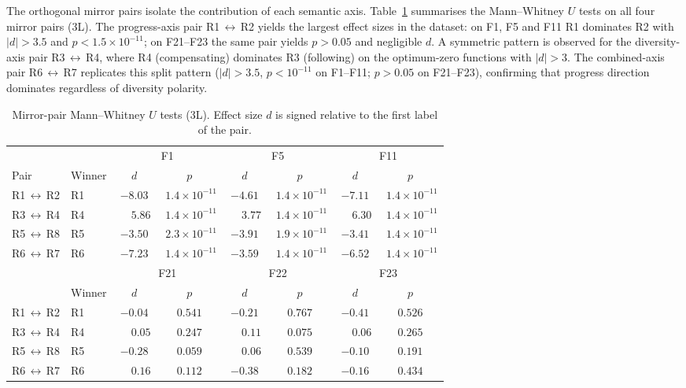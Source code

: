 \documentclass[runningheads]{llncs}
\begin{document}
The orthogonal mirror pairs isolate the contribution of each semantic axis. Table~\ref{tab:mirror} summarises the Mann--Whitney $U$ tests on all four mirror pairs (3L). The progress-axis pair R1\,$\leftrightarrow$\,R2 yields the largest effect sizes in the dataset: on F1, F5 and F11 R1 dominates R2 with $|d|>3.5$ and $p<1.5\times 10^{-11}$; on F21--F23 the same pair yields $p>0.05$ and negligible $d$. A symmetric pattern is observed for the diversity-axis pair R3\,$\leftrightarrow$\,R4, where R4 (compensating) dominates R3 (following) on the optimum-zero functions with $|d|>3$. The combined-axis pair R6\,$\leftrightarrow$\,R7 replicates this split pattern ($|d|>3.5$, $p<10^{-11}$ on F1--F11; $p>0.05$ on F21--F23), confirming that progress direction dominates regardless of diversity polarity.





\begin{table}[H]
\scriptsize
\caption{Mirror-pair Mann--Whitney $U$ tests (3L). Effect size $d$ is signed relative to the first label of the pair.}\label{tab:mirror}
\centering
\setlength{\tabcolsep}{3pt}
\begin{tabular}{ll cc cc cc}
\toprule
& & \multicolumn{2}{c}{F1} & \multicolumn{2}{c}{F5} & \multicolumn{2}{c}{F11} \\
Pair & Winner & $d$ & $p$ & $d$ & $p$ & $d$ & $p$ \\
\midrule
R1\,$\leftrightarrow$\,R2 & R1 & $-8.03$ & $\,\,1.4\!\times\!10^{-11}$ & $-4.61$ & $\,\,1.4\!\times\!10^{-11}$ & $-7.11$ & $\,\,1.4\!\times\!10^{-11}$ \\
R3\,$\leftrightarrow$\,R4 & R4 & $\phantom{-}5.86$ & $\,\,1.4\!\times\!10^{-11}$ & $\phantom{-}3.77$ & $\,\,1.4\!\times\!10^{-11}$ & $\phantom{-}6.30$ & $\,\,1.4\!\times\!10^{-11}$ \\
R5\,$\leftrightarrow$\,R8 & R5 & $-3.50$ & $\,\,2.3\!\times\!10^{-11}$ & $-3.91$ & $\,\,1.9\!\times\!10^{-11}$ & $-3.41$ & $\,\,1.4\!\times\!10^{-11}$ \\
R6\,$\leftrightarrow$\,R7 & R6 & $-7.23$ & $\,\,1.4\!\times\!10^{-11}$ & $-3.59$ & $\,\,1.4\!\times\!10^{-11}$ & $-6.52$ & $\,\,1.4\!\times\!10^{-11}$ \\
\midrule
& & \multicolumn{2}{c}{F21} & \multicolumn{2}{c}{F22} & \multicolumn{2}{c}{F23} \\
& Winner & $d$ & $p$ & $d$ & $p$ & $d$ & $p$ \\
\midrule
R1\,$\leftrightarrow$\,R2 & R1 & $-0.04$ & $0.541$ & $-0.21$ & $0.767$ & $-0.41$ & $0.526$ \\
R3\,$\leftrightarrow$\,R4 & R4 & $\phantom{-}0.05$ & $0.247$ & $\phantom{-}0.11$ & $0.075$ & $\phantom{-}0.06$ & $0.265$ \\
R5\,$\leftrightarrow$\,R8 & R5 & $-0.28$ & $0.059$ & $\phantom{-}0.06$ & $0.539$ & $-0.10$ & $0.191$ \\
R6\,$\leftrightarrow$\,R7 & R6 & $\phantom{-}0.16$ & $0.112$ & $-0.38$ & $0.182$ & $-0.16$ & $0.434$ \\
\bottomrule
\end{tabular}
\end{table}
\end{document}
